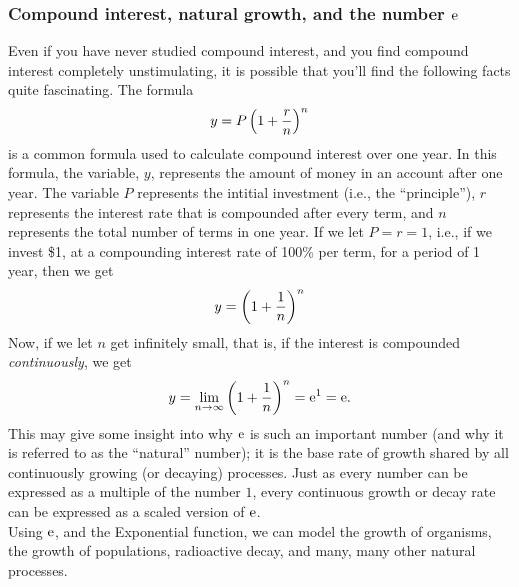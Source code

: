 \subsubsection{Compound interest, natural growth, and the number $\mathrm{e}$}
Even if you have never studied compound interest, and you find compound interest completely unstimulating, it is possible that you'll find the following facts quite fascinating. The formula
\[
y = P\left(1 + \frac{r}{n}\right)^n
\]
is a common formula used to calculate compound interest over one year. In this formula, the variable, $y$, represents the amount of money in an account after one year. The variable $P$ represents the intitial investment (i.e., the ``principle''), $r$ represents the interest rate that is compounded after every term, and $n$ represents the total number of terms in one year. If we let $P = r = 1$, i.e., if we invest \$1, at a compounding interest rate of 100\% per term, for a period of 1 year, then we get
\[
y =  \left(1 + \frac{1}{n}\right)^n
\]
 Now, if we let $n$ get infinitely small, that is, if the interest is compounded \textit{continuously}, we get
 \[
 y = \lim_{n \rightarrow \infty}\left(1 + \frac{1}{n}\right)^n = \mathrm{e}^1 = \mathrm{e}.
 \]
 This may give some insight into why $\mathrm{e}$ is such an important number (and why it is referred to as the ``natural'' number); it is the base rate of growth shared by all continuously growing (or decaying) processes. Just as every number can be expressed as a multiple of the number $1$, every continuous growth or decay rate can be expressed as a scaled version of $\mathrm{e}$.\\
 
\noindent Using $\mathrm{e}$, and the Exponential function, we can model the growth of organisms, the growth of populations, radioactive decay, and many, many other natural processes.

 
 